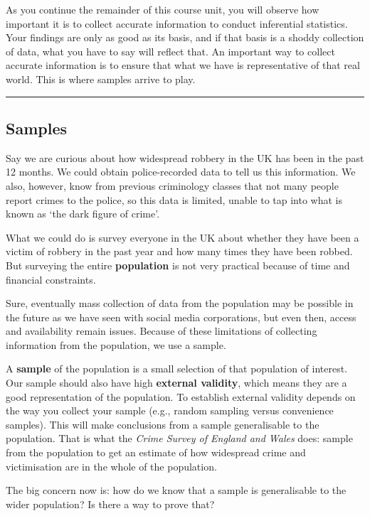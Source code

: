 \documentclass[
]{book}
\begin{document}
As you continue the remainder of this course unit, you will observe how important it is to collect accurate information to conduct inferential statistics. Your findings are only as good as its basis, and if that basis is a shoddy collection of data, what you have to say will reflect that. An important way to collect accurate information is to ensure that what we have is representative of that real world. This is where samples arrive to play.

\begin{center}\rule{0.5\linewidth}{0.5pt}\end{center}

\hypertarget{samples}{%
\subsection{Samples}\label{samples}}

Say we are curious about how widespread robbery in the UK has been in the past 12 months. We could obtain police-recorded data to tell us this information. We also, however, know from previous criminology classes that not many people report crimes to the police, so this data is limited, unable to tap into what is known as `the dark figure of crime'.

What we could do is survey everyone in the UK about whether they have been a victim of robbery in the past year and how many times they have been robbed. But surveying the entire \textbf{population} is not very practical because of time and financial constraints.

Sure, eventually mass collection of data from the population may be possible in the future as we have seen with social media corporations, but even then, access and availability remain issues. Because of these limitations of collecting information from the population, we use a sample.

A \textbf{sample} of the population is a small selection of that population of interest. Our sample should also have high \textbf{external validity}, which means they are a good representation of the population. To establish external validity depends on the way you collect your sample (e.g., random sampling versus convenience samples). This will make conclusions from a sample generalisable to the population. That is what the \emph{Crime Survey of England and Wales} does: sample from the population to get an estimate of how widespread crime and victimisation are in the whole of the population.

The big concern now is: how do we know that a sample is generalisable to the wider population? Is there a way to prove that?
\end{document}
